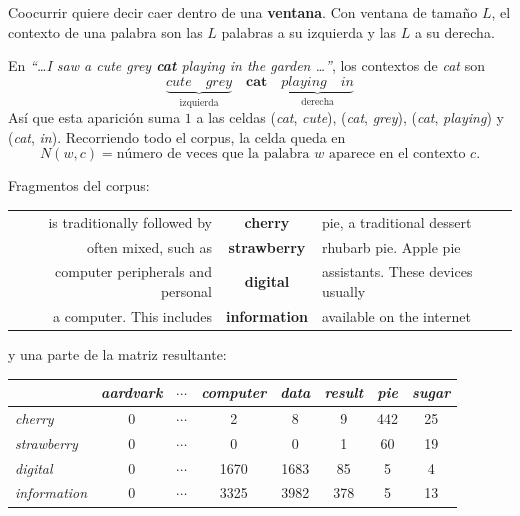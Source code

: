 \documentclass[11pt,letterpaper]{article}
\begin{document}
Coocurrir quiere decir caer dentro de una \textbf{ventana}. Con
ventana de tamaño $L$, el contexto de una palabra son las $L$ palabras
a su izquierda y las $L$ a su derecha.

\begin{ejemplo}
    En \textit{``\ldots I saw a cute grey \textbf{cat} playing in the
    garden \ldots''}, los contextos de \textit{cat} son
    \[
        \underbrace{\textit{cute} \quad \textit{grey}}_{\text{izquierda}}
        \quad \textbf{cat} \quad
        \underbrace{\textit{playing} \quad \textit{in}}_{\text{derecha}}
    \]
    Así que esta aparición suma $1$ a las celdas
    (\textit{cat}, \textit{cute}), (\textit{cat}, \textit{grey}),
    (\textit{cat}, \textit{playing}) y (\textit{cat}, \textit{in}).
    Recorriendo todo el corpus, la celda queda en
    \[
        N(w, c) = \text{número de veces que la palabra } w
                  \text{ aparece en el contexto } c .
    \]
\end{ejemplo}

\begin{ejemplo}
    Fragmentos del corpus:
    \begin{center}
    \small
    \begin{tabular}{r@{\quad}c@{\quad}l}
        is traditionally followed by & \textbf{cherry}
            & pie, a traditional dessert \\
        often mixed, such as & \textbf{strawberry}
            & rhubarb pie. Apple pie \\
        computer peripherals and personal & \textbf{digital}
            & assistants. These devices usually \\
        a computer. This includes & \textbf{information}
            & available on the internet \\
    \end{tabular}
    \end{center}
    y una parte de la matriz resultante:
    \begin{center}
    \begin{tabular}{lccccccc}
        \toprule
        & \textit{aardvark} & $\cdots$ & \textit{computer}
        & \textit{data} & \textit{result} & \textit{pie}
        & \textit{sugar} \\
        \midrule
        \textit{cherry}      & 0 & $\cdots$ & 2    & 8    & 9   & 442
                             & 25 \\
        \textit{strawberry}  & 0 & $\cdots$ & 0    & 0    & 1   & 60
                             & 19 \\
        \textit{digital}     & 0 & $\cdots$ & 1670 & 1683 & 85  & 5
                             & 4  \\
        \textit{information} & 0 & $\cdots$ & 3325 & 3982 & 378 & 5
                             & 13 \\
        \bottomrule
    \end{tabular}
    \end{center}
\end{ejemplo}
\end{document}

